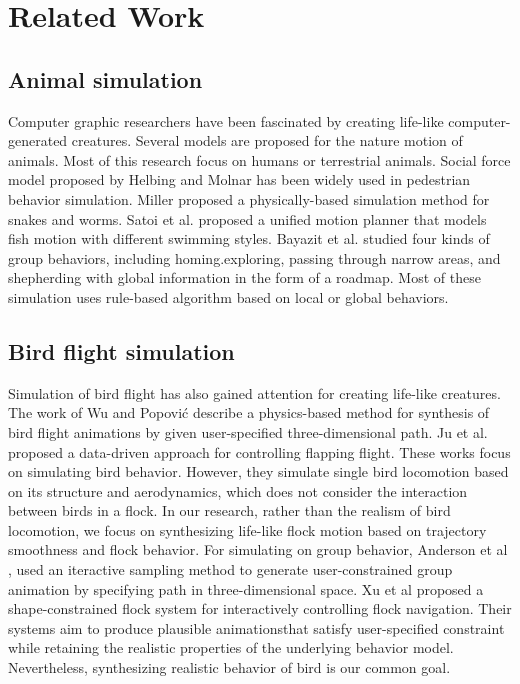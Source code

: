 \chapter{Related Work}

\section{Animal simulation}

Computer graphic researchers have been fascinated by creating life-like computer-generated creatures. Several models are proposed for the nature motion of animals. Most of this research focus on humans or terrestrial animals. Social force model proposed by Helbing and Molnar \cite{Social} has been widely used in pedestrian behavior simulation. Miller \cite{Snake} proposed a physically-based simulation method for snakes and worms. Satoi et al. proposed a unified motion planner \cite{Fish} that models fish motion with different swimming styles. Bayazit et al. \cite{OB1,OB2} studied four kinds of group behaviors, including homing.exploring, passing through narrow areas, and shepherding with global information in the form of a roadmap. Most of these simulation uses rule-based algorithm based on local or global behaviors. 

\section{Bird flight simulation}

Simulation of bird flight has also gained attention for creating life-like creatures. The work of Wu and Popović \cite{Flight} describe a physics-based method for synthesis of bird flight animations by given user-specified three-dimensional path. Ju et al. \cite{Flappy} proposed a data-driven approach for controlling flapping flight. These works focus on simulating bird behavior. However, they simulate single bird locomotion based on its structure and aerodynamics, which does not consider the interaction between birds in a flock. In our research, rather than the realism of bird locomotion, we focus on synthesizing life-like flock motion based on trajectory smoothness and flock behavior. For simulating on group behavior, Anderson et al \cite{Constrained}, used an iteractive sampling method to generate user-constrained group animation by specifying path in three-dimensional space. Xu et al \cite{Shape} proposed a shape-constrained flock system for interactively controlling flock navigation. Their systems aim to produce plausible animationsthat satisfy user-specified constraint while retaining the realistic properties of the underlying behavior model. Nevertheless, synthesizing realistic behavior of bird is our common goal. 

